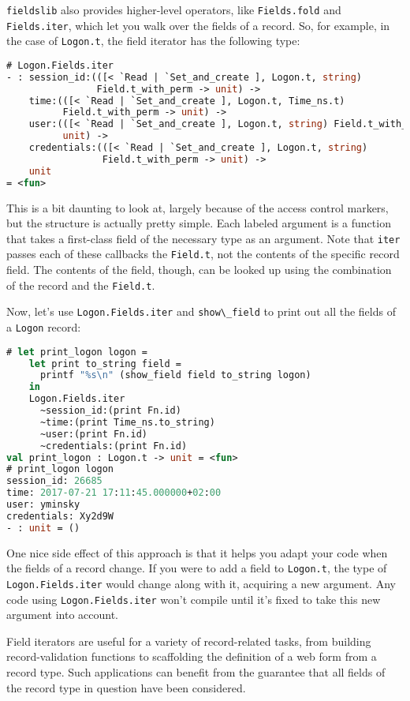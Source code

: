 \passthrough{\lstinline!fieldslib!} also provides higher-level
operators, like \passthrough{\lstinline!Fields.fold!} and
\passthrough{\lstinline!Fields.iter!}, which let you walk over the
fields of a record. So, for example, in the case of
\passthrough{\lstinline!Logon.t!}, the field iterator has the following
type:

\begin{lstlisting}[language=Caml]
# Logon.Fields.iter
- : session_id:(([< `Read | `Set_and_create ], Logon.t, string)
                Field.t_with_perm -> unit) ->
    time:(([< `Read | `Set_and_create ], Logon.t, Time_ns.t)
          Field.t_with_perm -> unit) ->
    user:(([< `Read | `Set_and_create ], Logon.t, string) Field.t_with_perm ->
          unit) ->
    credentials:(([< `Read | `Set_and_create ], Logon.t, string)
                 Field.t_with_perm -> unit) ->
    unit
= <fun>
\end{lstlisting}

This is a bit daunting to look at, largely because of the access control
markers, but the structure is actually pretty simple. Each labeled
argument is a function that takes a first-class field of the necessary
type as an argument. Note that \passthrough{\lstinline!iter!} passes
each of these callbacks the \passthrough{\lstinline!Field.t!}, not the
contents of the specific record field. The contents of the field,
though, can be looked up using the combination of the record and the
\passthrough{\lstinline!Field.t!}.

Now, let's use \passthrough{\lstinline!Logon.Fields.iter!} and
\passthrough{\lstinline!show\_field!} to print out all the fields of a
\passthrough{\lstinline!Logon!} record:

\begin{lstlisting}[language=Caml]
# let print_logon logon =
    let print to_string field =
      printf "%s\n" (show_field field to_string logon)
    in
    Logon.Fields.iter
      ~session_id:(print Fn.id)
      ~time:(print Time_ns.to_string)
      ~user:(print Fn.id)
      ~credentials:(print Fn.id)
val print_logon : Logon.t -> unit = <fun>
# print_logon logon
session_id: 26685
time: 2017-07-21 17:11:45.000000+02:00
user: yminsky
credentials: Xy2d9W
- : unit = ()
\end{lstlisting}

One nice side effect of this approach is that it helps you adapt your
code when the fields of a record change. If you were to add a field to
\passthrough{\lstinline!Logon.t!}, the type of
\passthrough{\lstinline!Logon.Fields.iter!} would change along with it,
acquiring a new argument. Any code using
\passthrough{\lstinline!Logon.Fields.iter!} won't compile until it's
fixed to take this new argument into account.

Field iterators are useful for a variety of record-related tasks, from
building record-validation functions to scaffolding the definition of a
web form from a record type. Such applications can benefit from the
guarantee that all fields of the record type in question have been
considered.
